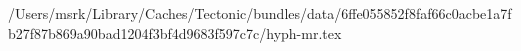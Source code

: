 /Users/msrk/Library/Caches/Tectonic/bundles/data/6ffe055852f8faf66c0acbe1a7fb27f87b869a90bad1204f3bf4d9683f597c7c/hyph-mr.tex